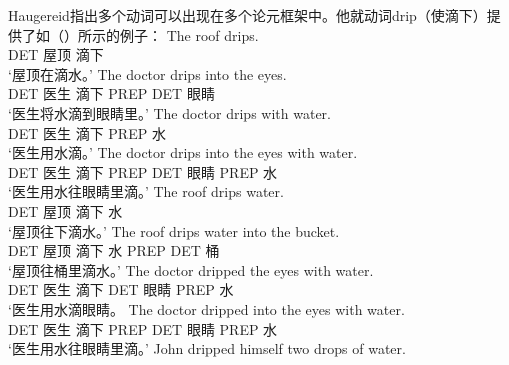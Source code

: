\begin{exe}
\begin{xlist}[iv.]
\begin{exe}
\begin{xlist}[iv.]
\noindent
Haugereid指出多个动词可以出现在多个论元框架中。他就动词drip（使滴下）提供了如（）所示的例子：
\eal
\settowidth{}
\ex
\gll The roof drips.                    \\
     DET 屋顶 滴下\\
\glt `屋顶在滴水。' 
\ex
\gll The doctor drips into the eyes.    \\
     DET 医生 滴下 PREP DET 眼睛\\
\glt `医生将水滴到眼睛里。' 
\ex
\gll The doctor drips with water.       \\
     DET 医生 滴下 PREP 水\\
\glt `医生用水滴。' 
\ex
\gll The doctor drips into the eyes with water. \\
     DET 医生 滴下 PREP DET 眼睛 PREP 水\\
\glt `医生用水往眼睛里滴。' 
\ex
\gll The roof drips water.                      \\
     DET 屋顶 滴下 水\\
\glt `屋顶往下滴水。' 
\ex
\gll The roof drips water into the bucket.      \\
     DET 屋顶 滴下 水 PREP DET 桶\\
\glt `屋顶往桶里滴水。' 
\ex
\gll The doctor dripped the eyes with water.    \\
     DET 医生 滴下 DET 眼睛 PREP 水\\
\glt `医生用水滴眼睛。
\ex
\gll The doctor dripped into the eyes with water. \\
     DET 医生 滴下 PREP DET 眼睛 PREP 水\\
\glt `医生用水往眼睛里滴。' 
\ex
\gll John dripped himself two drops of water.     \\

\end{xlist}
\end{exe}
\end{xlist}
\end{exe}
